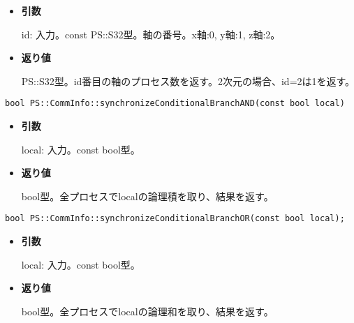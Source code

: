 \begin{itemize}

\item{{\bf 引数}}

id: 入力。const PS::S32型。軸の番号。x軸:0, y軸:1, z軸:2。

\item{{\bf 返り値}}

PS::S32型。id番目の軸のプロセス数を返す。2次元の場合、id=2は1を返す。

\end{itemize}


\begin{screen}
\begin{verbatim}
bool PS::CommInfo::synchronizeConditionalBranchAND(const bool local)
\end{verbatim}
\end{screen}

\begin{itemize}

\item{{\bf 引数}}

local: 入力。const bool型。

\item{{\bf 返り値}}

bool型。全プロセスでlocalの論理積を取り、結果を返す。

\end{itemize}


\begin{screen}
\begin{verbatim}
bool PS::CommInfo::synchronizeConditionalBranchOR(const bool local);
\end{verbatim}
\end{screen}

\begin{itemize}

\item{{\bf 引数}}

local: 入力。const bool型。

\item{{\bf 返り値}}

bool型。全プロセスでlocalの論理和を取り、結果を返す。

\end{itemize}


